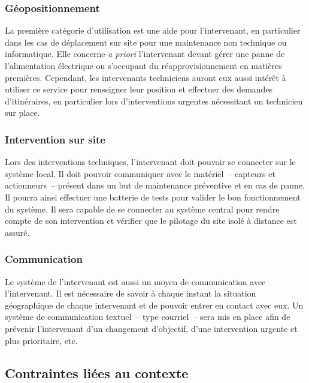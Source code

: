 \documentclass[a4paper, 11pt, final]{article}
\begin{document}
\subsubsection{Géopositionnement}
La première catégorie d'utilisation est une aide pour l'intervenant, en particulier dans les cas de déplacement sur site pour une maintenance non technique ou informatique. Elle concerne \textit{a priori} l'intervenant devant gérer une panne de l'alimentation électrique ou s'occupant du réapprovisionnement en matières premières. Cependant, les intervenants techniciens auront eux aussi intérêt à utiliser ce service pour renseigner leur position et effectuer des demandes d'itinéraires, en particulier lors d'interventions urgentes nécessitant un technicien sur place.

\subsubsection{Intervention sur site}
Lors des interventions techniques, l'intervenant doit pouvoir se connecter sur le système local. Il doit pouvoir communiquer avec le matériel~-- capteurs et actionneurs~-- présent dans un but de maintenance préventive et en cas de panne. Il pourra ainsi effectuer une batterie de tests pour valider le bon fonctionnement du système. Il sera capable de se connecter au système central pour rendre compte de son intervention et vérifier que le pilotage du site isolé à distance est assuré.

\subsubsection{Communication}
Le système de l'intervenant est aussi un moyen de communication avec l'intervenant. Il est nécessaire de savoir à chaque instant la situation géographique de chaque intervenant et de pouvoir entrer en contact avec eux. Un système de communication textuel~-- type courriel~-- sera mis en place afin de prévenir l'intervenant d'un changement d'objectif, d'une intervention urgente et plus prioritaire, etc.

\subsection{Contraintes liées au contexte}
\end{document}
